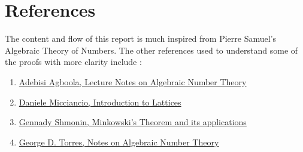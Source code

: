 \section*{References}

The content and flow of this report is much inspired from Pierre Samuel's Algebraic Theory of Numbers. The other references used to understand some of the proofs with more clarity include :

\begin{enumerate}
  \item \href{https://web.math.ucsb.edu/~agboola/teaching/2021/fall/225A/notes/lecture_XII.pdf}{Adebisi Agboola, Lecture Notes on Algebraic Number Theory}

  \item \href{https://cseweb.ucsd.edu/classes/wi10/cse206a/lec1.pdf}{Daniele Micciancio, Introduction to Lattices}

  \item \href{https://www.epfl.ch/labs/disopt/wp-content/uploads/2018/09/minkowski.pdf}{Gennady Shmonin, Minkowski's Theorem and its applications}

  \item \href{https://web.ma.utexas.edu/users/gdavtor/notes/alg_nt_notes.pdf}{George D. Torres, Notes on Algebraic Number Theory}
\end{enumerate}
